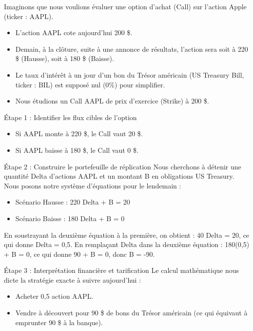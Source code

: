 \begin{examplebox}
Imaginons que nous voulions évaluer une option d'achat (Call) sur l'action Apple (ticker : AAPL).
\begin{itemize}[label=$\rightarrow$]
    \item L'action AAPL cote aujourd'hui 200 \$.
    \item Demain, à la clôture, suite à une annonce de résultats, l'action sera soit à 220 \$ (Hausse), soit à 180 \$ (Baisse).
    \item Le taux d'intérêt à un jour d'un bon du Trésor américain (US Treasury Bill, ticker : BIL) est supposé nul (0\%) pour simplifier.
    \item Nous étudions un Call AAPL de prix d'exercice (Strike) à 200 \$.
\end{itemize}

Étape 1 : Identifier les flux cibles de l'option
\begin{itemize}[label=$\cdot$]
    \item Si AAPL monte à 220 \$, le Call vaut 20 \$.
    \item Si AAPL baisse à 180 \$, le Call vaut 0 \$.
\end{itemize}

Étape 2 : Construire le portefeuille de réplication
Nous cherchons à détenir une quantité Delta d'actions AAPL et un montant B en obligations US Treasury. Nous posons notre système d'équations pour le lendemain :
\begin{itemize}[label=$\cdot$]
    \item Scénario Hausse : 220 Delta + B = 20
    \item Scénario Baisse : 180 Delta + B = 0
\end{itemize}

En soustrayant la deuxième équation à la première, on obtient : 
40 Delta = 20, ce qui donne Delta = 0,5.
En remplaçant Delta dans la deuxième équation : 
180(0,5) + B = 0, ce qui donne 90 + B = 0, donc B = -90.

Étape 3 : Interprétation financière et tarification
Le calcul mathématique nous dicte la stratégie exacte à suivre aujourd'hui :
\begin{itemize}[label=$\cdot$]
    \item Acheter 0,5 action AAPL.
    \item Vendre à découvert pour 90 \$ de bons du Trésor américain (ce qui équivaut à emprunter 90 \$ à la banque).
\end{itemize}


\end{examplebox}
